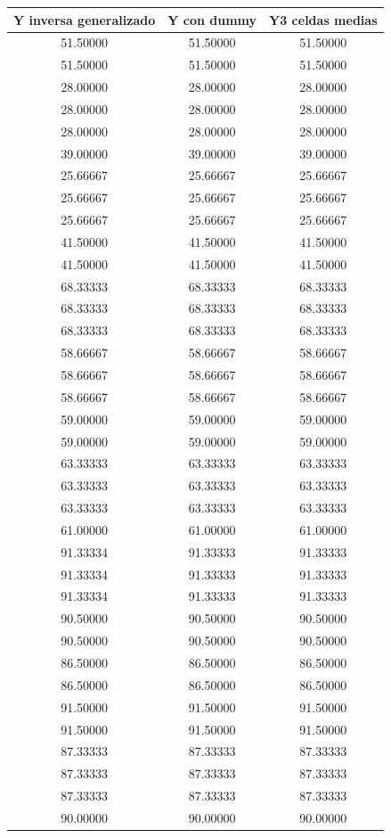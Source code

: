 \documentclass[10pt,a4paper]{report}
\begin{document}
\begin{enumerate}
\begin{tabular}{| c | c | c |}
\hline
Y inversa generalizado & Y con dummy & Y3 celdas medias\\ \hline
51.50000&51.50000&51.50000\\
51.50000&51.50000&51.50000\\
28.00000&28.00000&28.00000\\
28.00000&28.00000&28.00000\\
28.00000&28.00000&28.00000\\
39.00000&39.00000&39.00000\\
25.66667&25.66667&25.66667\\
25.66667&25.66667&25.66667\\
25.66667&25.66667&25.66667\\
41.50000&41.50000&41.50000\\
41.50000&41.50000&41.50000\\
68.33333&68.33333&68.33333\\
68.33333&68.33333&68.33333\\
68.33333&68.33333&68.33333\\
58.66667&58.66667&58.66667\\
58.66667&58.66667&58.66667\\
58.66667&58.66667&58.66667\\
59.00000&59.00000&59.00000\\
59.00000&59.00000&59.00000\\
63.33333&63.33333&63.33333\\
63.33333&63.33333&63.33333\\
63.33333&63.33333&63.33333\\
61.00000&61.00000&61.00000\\
91.33334&91.33333&91.33333\\
91.33334&91.33333&91.33333\\
91.33334&91.33333&91.33333\\
90.50000&90.50000&90.50000\\
90.50000&90.50000&90.50000\\
86.50000&86.50000&86.50000\\
86.50000&86.50000&86.50000\\
91.50000&91.50000&91.50000\\
91.50000&91.50000&91.50000\\
87.33333&87.33333&87.33333\\
87.33333&87.33333&87.33333\\
87.33333&87.33333&87.33333\\
90.00000&90.00000&90.00000\\

\end{tabular}
\end{enumerate}
\end{document}
